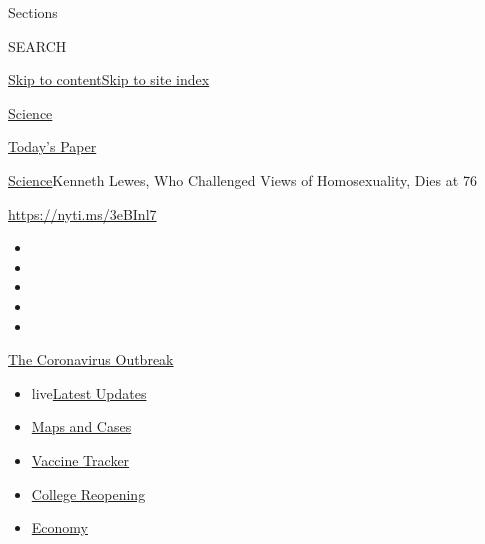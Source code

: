 Sections

SEARCH

\protect\hyperlink{site-content}{Skip to
content}\protect\hyperlink{site-index}{Skip to site index}

\href{https://www.nytimes3xbfgragh.onion/section/science}{Science}

\href{https://myaccount.nytimes3xbfgragh.onion/auth/login?response_type=cookie\&client_id=vi}{}

\href{https://www.nytimes3xbfgragh.onion/section/todayspaper}{Today's
Paper}

\href{/section/science}{Science}\textbar{}Kenneth Lewes, Who Challenged
Views of Homosexuality, Dies at 76

\url{https://nyti.ms/3eBInl7}

\begin{itemize}
\item
\item
\item
\item
\item
\end{itemize}

\href{https://www.nytimes3xbfgragh.onion/news-event/coronavirus?action=click\&pgtype=Article\&state=default\&region=TOP_BANNER\&context=storylines_menu}{The
Coronavirus Outbreak}

\begin{itemize}
\tightlist
\item
  live\href{https://www.nytimes3xbfgragh.onion/2020/08/04/world/coronavirus-covid-19.html?action=click\&pgtype=Article\&state=default\&region=TOP_BANNER\&context=storylines_menu}{Latest
  Updates}
\item
  \href{https://www.nytimes3xbfgragh.onion/interactive/2020/us/coronavirus-us-cases.html?action=click\&pgtype=Article\&state=default\&region=TOP_BANNER\&context=storylines_menu}{Maps
  and Cases}
\item
  \href{https://www.nytimes3xbfgragh.onion/interactive/2020/science/coronavirus-vaccine-tracker.html?action=click\&pgtype=Article\&state=default\&region=TOP_BANNER\&context=storylines_menu}{Vaccine
  Tracker}
\item
  \href{https://www.nytimes3xbfgragh.onion/2020/08/02/us/covid-college-reopening.html?action=click\&pgtype=Article\&state=default\&region=TOP_BANNER\&context=storylines_menu}{College
  Reopening}
\item
  \href{https://www.nytimes3xbfgragh.onion/live/2020/08/03/business/stock-market-today-coronavirus?action=click\&pgtype=Article\&state=default\&region=TOP_BANNER\&context=storylines_menu}{Economy}
\end{itemize}

